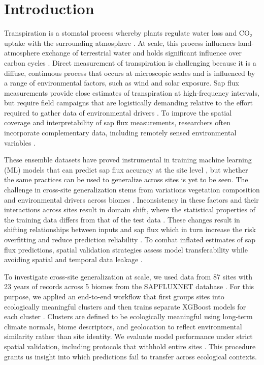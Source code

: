 \documentclass[graybox]{svmult}
\begin{document}
\section{Introduction}
\label{sec:1}
Transpiration is a stomatal process whereby plants regulate water loss and CO₂ uptake with the surrounding atmosphere \cite{mott_stomatal_2010}. At scale, this process influences land-atmosphere exchange of terrestrial water and holds significant influence over carbon cycles \cite{poyatos_global_2021}. Direct measurement of transpiration is challenging because it is a diffuse, continuous process that occurs at microscopic scales and is influenced by a range of environmental factors, such as wind and solar exposure. Sap flux measurements provide close estimates of transpiration at high-frequency intervals, but require field campaigns that are logistically demanding relative to the effort required to gather data of environmental drivers \cite{poyatos_global_2021}. To improve the spatial coverage and interpretability of sap flux measurements, researchers often incorporate complementary data, including remotely sensed environmental variables \cite{ellsaser_predicting_2020}.

These ensemble datasets have proved instrumental in training machine learning (ML) models that can predict sap flux accuracy at the site level \cite{ellsaser_predicting_2020, kabala_reconstruction_2025}, but whether the same practices can be used to generalize across sites is yet to be seen. The challenge in cross-site generalization stems from variations vegetation composition and environmental drivers across biomes \cite{poyatos_global_2021, peel_updated_2007}. Inconsistency in these factors and their interactions across sites result in domain shift, where the statistical properties of the training data differs from that of the test data \cite{moreno-torres_unifying_2012, quinonero-candela_dataset_2009}. These changes result in shifting relationships between inputs and sap flux which in turn increase the risk overfitting and reduce prediction reliability \cite{liu_soil_2020, zheng_divergent_2023, tyree_hydraulic_2003}. To combat inflated estimates of sap flux predictions, spatial validation strategies assess model transferability while avoiding spatial and temporal data leakage \cite{roberts_crossvalidation_2017, trachsel_telford_2016}.

To investigate cross-site generalization at scale, we used data from 87 sites with 23 years of records across 5 biomes from the SAPFLUXNET database \cite{poyatos_global_2021}. For this purpose, we applied an end-to-end workflow that first groups sites into ecologically meaningful clusters and then trains separate XGBoost models for each cluster \cite{chen_xgboost_2016}. Clusters are defined to be ecologically meaningful using long-term climate normals, biome descriptors, and geolocation to reflect environmental similarity rather than site identity. We evaluate model performance under strict spatial validation, including protocols that withhold entire sites \cite{roberts_crossvalidation_2017}. This procedure grants us insight into which predictions fail to transfer across ecological contexts.
\end{document}
